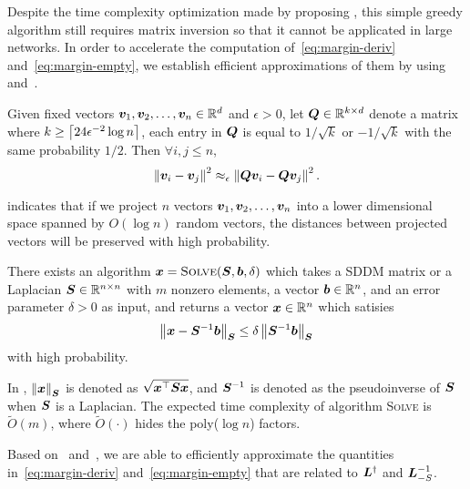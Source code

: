 \documentclass[sigconf]{acmart}
\begin{document}
Despite the time complexity optimization made by proposing , this simple greedy algorithm still requires matrix inversion so that it cannot be applicated in large networks. In order to accelerate the computation of~\eqref{eq:margin-deriv} and~\eqref{eq:margin-empty}, we establish efficient approximations of them by using~ and~.

\begin{lemma}\label{lem:JL}
  Given fixed vectors \(\boldsymbol{v}_1,\boldsymbol{v}_2,\dots,\boldsymbol{v}_n\in\mathbb{R}^d\) and \(\epsilon>0\), let \(\boldsymbol{Q}\in\mathbb{R}^{k\times d}\) denote a matrix where \(k\ge\left\lceil24\epsilon^{-2}\log n\right\rceil\), each entry in \(\boldsymbol{Q}\) is equal to \(1/\sqrt k\) or \(-1/\sqrt k\) with the same probability \(1/2\). Then \(\forall i,j\le n\),
  \begin{equation}\label{eq:JL}
    \left\Vert\boldsymbol{v}_i-\boldsymbol{v}_j\right\Vert^2\approx_\epsilon\left\Vert\boldsymbol{Q}\boldsymbol{v}_i-\boldsymbol{Q}\boldsymbol{v}_j\right\Vert^2.
  \end{equation}
\end{lemma}
 indicates that if we project \(n\) vectors \(\boldsymbol{v}_1,\boldsymbol{v}_2,\dots,\boldsymbol{v}_n\) into a lower dimensional space spanned by \(O(\log n)\) random vectors, the distances between projected vectors will be preserved with high probability.

\begin{lemma}\label{lem:solver}
  There exists an algorithm \(\boldsymbol{x}=\textsc{Solve}(\boldsymbol{S},\boldsymbol{b},\delta)\) which takes a SDDM matrix or a Laplacian \(\boldsymbol{S}\in\mathbb{R}^{n\times n}\) with \(m\) nonzero elements, a vector \(\boldsymbol{b}\in\mathbb{R}^n\), and an error parameter \(\delta>0\) as input, and returns a vector \(\boldsymbol{x}\in\mathbb{R}^n\) which satisies
  \[\left\Vert\boldsymbol{x}-\boldsymbol{S}^{-1}\boldsymbol{b}\right\Vert_{\boldsymbol{S}}\le\delta\left\Vert\boldsymbol{S}^{-1}\boldsymbol{b}\right\Vert_{\boldsymbol{S}}\]
  with high probability.
\end{lemma}

In , \(\left\Vert\boldsymbol{x}\right\Vert_{\boldsymbol{S}}\) is denoted as \(\sqrt{\boldsymbol{x}^\top\boldsymbol{S}\boldsymbol{x}}\), and \(\boldsymbol{S}^{-1}\) is denoted as the pseudoinverse of \(\boldsymbol{S}\) when \(\boldsymbol{S}\) is a Laplacian.
The expected time complexity of algorithm \textsc{Solve} is \(\tilde{O}(m)\), where \(\tilde{O}(\cdot)\) hides the poly(\(\log n\)) factors.

Based on~ and~, we are able to efficiently approximate the quantities in~\eqref{eq:margin-deriv} and~\eqref{eq:margin-empty} that are related to \(\boldsymbol{L}^\dagger\) and \(\boldsymbol{L}_{-S}^{-1}\).
\end{document}
